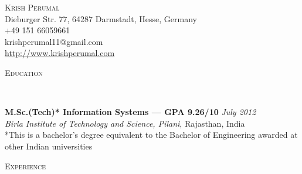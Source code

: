 \documentclass[9pt]{article}
\newenvironment{changemargin}[2]{%
  \begin{list}{}{%
    \setlength{\topsep}{0pt}%
    \setlength{\leftmargin}{#1}%
    \setlength{\rightmargin}{#2}%
    \setlength{\listparindent}{\parindent}%
    \setlength{\itemindent}{\parindent}%
    \setlength{\parsep}{\parskip}%
  }%
  \item[]}{\end{list}
}
\newcommand{\lineover}{
	\begin{changemargin}{-0.05in}{-0.05in}
		\vspace*{-8pt}
		\hrulefill \\
		\vspace*{-2pt}
	\end{changemargin}
}
\newcommand{\header}[1]{
	\begin{changemargin}{-0.5in}{-0.5in}
		\scshape{#1}\\
  	\lineover
	\end{changemargin}
}
\newcommand{\contact}[5]{
	\begin{changemargin}{-0.5in}{-0.5in}
		\begin{center}
			{\Large \scshape {#1}}\\ \smallskip
			{#2}\\ \smallskip 
			{#3}\\ \smallskip
			{#4}\\ \smallskip
			{#5}\\ \smallskip
		\end{center}
	\end{changemargin}
}
\newenvironment{body} {
	\vspace*{-16pt}
	\begin{changemargin}{-0.25in}{-0.5in}
  }	
	{\end{changemargin}
}
\begin{document}
\contact{Krish Perumal}{Dieburger Str. 77, 64287 Darmstadt, Hesse, Germany}{+49 151 66059661}{krishperumal11@gmail.com}{\url{http://www.krishperumal.com}}


% 
% 


\header{Education}

\begin{body}
	\vspace{14pt}
	\textbf{M.Sc.(Tech)* Information Systems --- GPA 9.26/10}{} \hfill \emph{July 2012}{} \\
	\emph{Birla Institute of Technology and Science, Pilani}, Rajasthan, India{} \\
	\smallskip
	\scriptsize{*This is a bachelor's degree equivalent to the Bachelor of Engineering awarded at other Indian universities} \\
\end{body}

\smallskip


\header{Experience}
\end{document}
